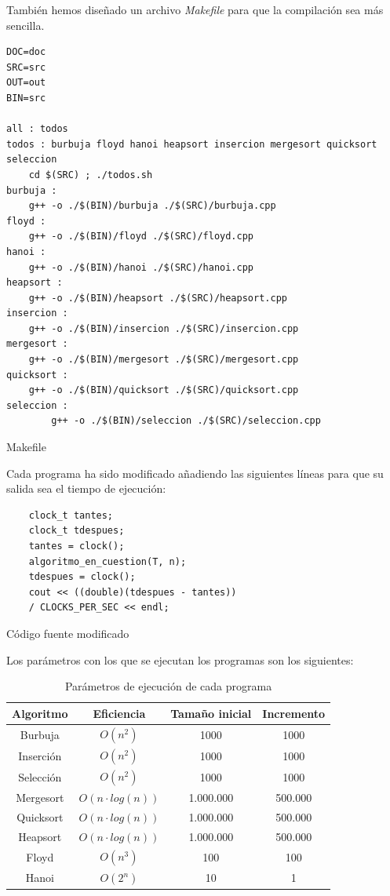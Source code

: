 \documentclass[12pt,spanish]{article}
\begin{document}
También hemos diseñado un archivo \textit{Makefile} para que la compilación sea más sencilla.
\begin{listing}[H]
\begin{verbatim}
DOC=doc
SRC=src
OUT=out
BIN=src

all : todos
todos : burbuja floyd hanoi heapsort insercion mergesort quicksort seleccion
	cd $(SRC) ; ./todos.sh
burbuja : 
	g++ -o ./$(BIN)/burbuja ./$(SRC)/burbuja.cpp
floyd : 
	g++ -o ./$(BIN)/floyd ./$(SRC)/floyd.cpp
hanoi : 
	g++ -o ./$(BIN)/hanoi ./$(SRC)/hanoi.cpp
heapsort : 
	g++ -o ./$(BIN)/heapsort ./$(SRC)/heapsort.cpp
insercion : 
	g++ -o ./$(BIN)/insercion ./$(SRC)/insercion.cpp
mergesort : 
	g++ -o ./$(BIN)/mergesort ./$(SRC)/mergesort.cpp
quicksort : 
	g++ -o ./$(BIN)/quicksort ./$(SRC)/quicksort.cpp
seleccion :
		g++ -o ./$(BIN)/seleccion ./$(SRC)/seleccion.cpp
\end{verbatim}
\caption{Makefile}
\end{listing}
\newpage
Cada programa ha sido modificado añadiendo las siguientes líneas para que su salida sea el tiempo de ejecución:
\begin{listing}[H]
\begin{verbatim}
	clock_t tantes;
	clock_t tdespues;
	tantes = clock();
	algoritmo_en_cuestion(T, n);
	tdespues = clock();
	cout << ((double)(tdespues - tantes))
	/ CLOCKS_PER_SEC << endl;
\end{verbatim}
\caption{Código fuente modificado	}
\end{listing}
Los parámetros con los que se ejecutan los programas son los siguientes:
\begin{table}[H]
\centering
\begin{tabular}{|c|c|c|c|}
\hline
\textbf{Algoritmo} & \textbf{Eficiencia} & \textbf{Tamaño inicial} & \textbf{Incremento}\\
\hline
Burbuja & $O(n^2)$ & 1000 & 1000 \\
\hline
Inserción & $O(n^2)$ & 1000 & 1000 \\
\hline
Selección & $O(n^2)$ & 1000 & 1000 \\
\hline
Mergesort & $O(n \cdot log(n))$ & 1.000.000 & 500.000 \\
\hline
Quicksort & $O(n \cdot log(n))$ & 1.000.000 & 500.000 \\
\hline
Heapsort & $O(n \cdot log(n))$ & 1.000.000 & 500.000 \\
\hline
Floyd & $O(n^3)$ & 100 & 100 \\
\hline
Hanoi & $O(2^n)$ & 10 & 1 \\
\hline
\end{tabular}
\caption{Parámetros de ejecución de cada programa}
\end{table}
\newpage
\end{document}
